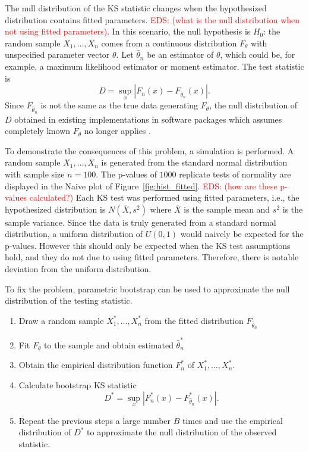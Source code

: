 \documentclass[12pt, letterpaper, titlepage]{article}
\newcommand{\eds}[1]{\textcolor{red}{EDS: (#1)}}
\begin{document}
The null distribution of the KS statistic changes when the hypothesized
distribution contains fitted parameters. 
\eds{what is the null distribution when not using fitted parameters}.  
In this scenario, the null hypothesis
is $H_0$: the random sample $X_1, \ldots, X_n$ comes from a continuous
distribution $F_{\theta}$ with unspecified parameter vector $\theta$.
Let $\hat\theta_n$ be an estimator of $\theta$, which could be, for example, a
maximum likelihood estimator or moment estimator. The test statistic is
\begin{equation}
  \label{eq:ks_fitted}
  D = \sup_x | F_n(x) - F_{\hat\theta_n}(x) |.
\end{equation}
Since $F_{\hat\theta_n}$ is not the same as the true data generating
$F_\theta$, the null distribution of $D$ obtained in existing implementations in
software packages which assumes completely known $F_\theta$ no longer applies
\citep{Steinskog}.


To demonstrate the consequences of this problem, a simulation is performed. A 
random sample $X_1, \ldots, X_n$ is generated from the standard normal 
distribution with sample size $n = 100$. The p-values of $1000$ replicate tests
 of normality  
are displayed in the Naive plot of Figure~\ref{fig:hist_fitted}. 
\eds{how are these p-values calculated?}
Each KS test 
was performed using fitted parameters, i.e., the hypothesized distribution is 
$N(\bar X, s^2)$ where $\bar X$ is the sample mean and $s^2$ is the sample 
variance. Since the data is truly generated from a standard normal distribution,
a uniform distribution of $U(0, 1)$ would naively be expected for the p-values.
However this should only be expected when the KS test assumptions hold, and they
 do not due to using fitted parameters. Therefore, 
there is notable deviation from the uniform distribution. 


To fix the problem, parametric bootstrap can be used to approximate the null
distribution of the testing statistic. 
\begin{enumerate}
  \item 
    Draw a random sample $X_1^*,...,X_n^*$ from the fitted distribution 
    $F_{\hat\theta_n}$
  \item 
    Fit $F_\theta$ to the sample and obtain estimated $\hat\theta_n^*$
  \item
    Obtain the empirical distribution function $F_n^*$ of $X_1^*, \ldots, 
    X_n^*$.
  \item 
    Calculate bootstrap KS statistic
    \[
      D^* = \sup_x | F_n^* (x)- F_{\hat\theta_n}^*(x) |.
    \]
  \item
    Repeat the previous steps a large number $B$ times and use the empirical 
    distribution of $D^*$ to approximate the null distribution of the observed 
    statistic.    
\end{enumerate}
\end{document}
